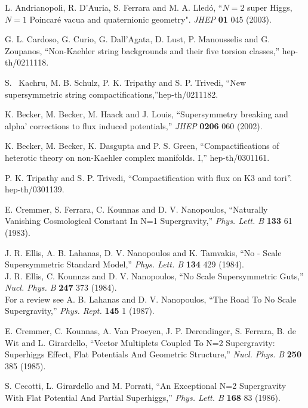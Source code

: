 \documentclass[a4paper,12pt]{article}
\begin{document}
\begin{thebibliography}{99}
 L. Andrianopoli, R. D'Auria, S. Ferrara and M. A. Lled\'o,
``$N=2$ super Higgs, $N=1$ Poincar\'e vacua and quaternionic
geometry". {\it JHEP} {\bf 01} 045 (2003).

G. L. Cardoso, G. Curio, G. Dall'Agata, D. Lust, P. Manousselis
and G. Zoupanos, ``Non-Kaehler string backgrounds and their five
torsion classes,'' hep-th/0211118.

S.~ Kachru, M. B. Schulz, P. K. Tripathy and S. P. Trivedi, ``New
supersymmetric string compactifications,''hep-th/0211182.


K. Becker, M. Becker, M. Haack and J. Louis, ``Supersymmetry
breaking and alpha' corrections to flux induced  potentials,''
{\it JHEP} {\bf 0206} 060 (2002).



K. Becker, M. Becker, K. Dasgupta and P. S. Green,
``Compactifications of heterotic theory on non-Kaehler complex
manifolds.  I,'' hep-th/0301161.

 P. K. Tripathy and S. P. Trivedi,
``Compactification with flux on K3 and tori''. hep-th/0301139.




 E. Cremmer, S. Ferrara, C. Kounnas and D. V. Nanopoulos,
``Naturally Vanishing Cosmological Constant In N=1 Supergravity,''
{\it Phys.  Lett.  B} {\bf 133} 61 (1983).



 J. R. Ellis, A. B. Lahanas, D. V. Nanopoulos and K. Tamvakis,
``No - Scale Supersymmetric Standard Model,'' {\it Phys.  Lett. B}
{\bf 134} 429 (1984). \\
J. R. Ellis, C. Kounnas and D. V. Nanopoulos, ``No Scale
Supersymmetric Guts,'' {\it Nucl. Phys.  B} {\bf 247} 373 (1984).\\
For a review  see A. B. Lahanas and D. V. Nanopoulos, ``The Road
To No Scale Supergravity,''
 {\it Phys.  Rept. } {\bf 145} 1 (1987).



 E. Cremmer, C. Kounnas, A. Van Proeyen, J. P.
 Derendinger, S. Ferrara, B. de Wit and L. Girardello,
``Vector Multiplets Coupled To N=2 Supergravity: Superhiggs
Effect, Flat Potentials And Geometric Structure,'' {\it Nucl.
Phys.  B} {\bf 250} 385 (1985).


 S.  Cecotti, L. Girardello and M. Porrati,
``An Exceptional N=2 Supergravity With Flat Potential And Partial
Superhiggs,''
 {\it Phys. Lett. B} {\bf 168} 83 (1986).




\end{thebibliography}
\end{document}

